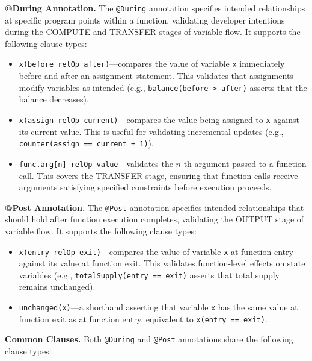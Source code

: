 \documentclass[pdflatex,sn-basic]{sn-jnl}%
\theoremstyle{thmstyleone}%
\theoremstyle{thmstyletwo}%
\theoremstyle{thmstylethree}%
\begin{document}
\smallskip
\noindent\textbf{@During Annotation.}
The \texttt{@During} annotation specifies intended relationships at specific program points within a function, validating developer intentions during the COMPUTE and TRANSFER stages of variable flow.
It supports the following clause types:

\begin{itemize}
    \item \texttt{x(before relOp after)}---compares the value of variable \texttt{x} immediately before and after an assignment statement. This validates that assignments modify variables as intended (e.g., \texttt{balance(before > after)} asserts that the balance decreases).

    \item \texttt{x(assign relOp current)}---compares the value being assigned to \texttt{x} against its current value. This is useful for validating incremental updates (e.g., \texttt{counter(assign == current + 1)}).

    \item \texttt{func.arg[n] relOp value}---validates the $n$-th argument passed to a function call. This covers the TRANSFER stage, ensuring that function calls receive arguments satisfying specified constraints before execution proceeds.
\end{itemize}

\smallskip
\noindent\textbf{@Post Annotation.}
The \texttt{@Post} annotation specifies intended relationships that should hold after function execution completes, validating the OUTPUT stage of variable flow.
It supports the following clause types:

\begin{itemize}
    \item \texttt{x(entry relOp exit)}---compares the value of variable \texttt{x} at function entry against its value at function exit. This validates function-level effects on state variables (e.g., \texttt{totalSupply(entry == exit)} asserts that total supply remains unchanged).

    \item \texttt{unchanged(x)}---a shorthand asserting that variable \texttt{x} has the same value at function exit as at function entry, equivalent to \texttt{x(entry == exit)}.
\end{itemize}

\smallskip
\noindent\textbf{Common Clauses.}
Both \texttt{@During} and \texttt{@Post} annotations share the following clause types:
\end{document}
